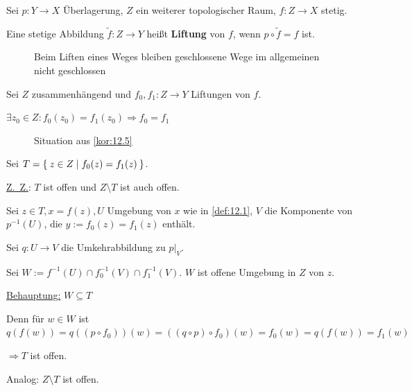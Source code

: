 \begin{definition}
    Sei $p: Y \rightarrow X$ Überlagerung, $Z$ ein weiterer topologischer
    Raum, $f:Z \rightarrow X$ stetig.

    Eine stetige Abbildung $\tilde{f}: Z \rightarrow Y$ heißt
    \textbf{Liftung} von $f$, wenn $p \circ \tilde{f} = f$ ist.
\end{definition}

\begin{figure}[htp]
    \centering
    \resizebox{0.95\linewidth}{!}{}
    \caption{Beim Liften eines Weges bleiben geschlossene Wege im allgemeinen nicht geschlossen}
    \label{fig:satz-seifert-van-kampen}
\end{figure}

\begin{bemerkung}\label{kor:12.5}%
    Sei $Z$ zusammenhängend und $f_0, f_1: Z \rightarrow Y$
    Liftungen von $f$.

    $\exists z_0 \in Z: f_0(z_0) = f_1(z_0) \Rightarrow f_0 = f_1$
\end{bemerkung}

\begin{figure}[htp]
    \centering
    
    \caption{Situation aus \cref{kor:12.5}}
    \label{fig:situation-kor-12.5}
\end{figure}

\begin{beweis}
    Sei $T = \Set{z \in Z | f_0(z) = f_1(z)}$.

    \underline{Z.~Z.}: $T$ ist offen und $Z \setminus T$ ist auch offen.

    Sei $z \in T, x = f(z), U$ Umgebung von $x$ wie in \cref{def:12.1},
    $V$ die Komponente von $p^{-1}(U)$, die $y:=f_0(z) = f_1(z)$
    enthält.

    Sei $q:U \rightarrow V$ die Umkehrabbildung zu $p|_V$.

    Sei $W:= f^{-1}(U) \cap f_0^{-1}(V) \cap f_1^{-1}(V)$. $W$ ist 
    offene Umgebung in $Z$ von $z$.

    \underline{Behauptung:} $W \subseteq T$

    Denn für $w \in W$ ist $q(f(w)) = q((p \circ f_0))(w) = ((q \circ p) \circ f_0) (w) = f_0(w) = q(f(w)) = f_1(w)$

    $\Rightarrow T$ ist offen.

    Analog: $Z \setminus T$ ist offen.
\end{beweis}


